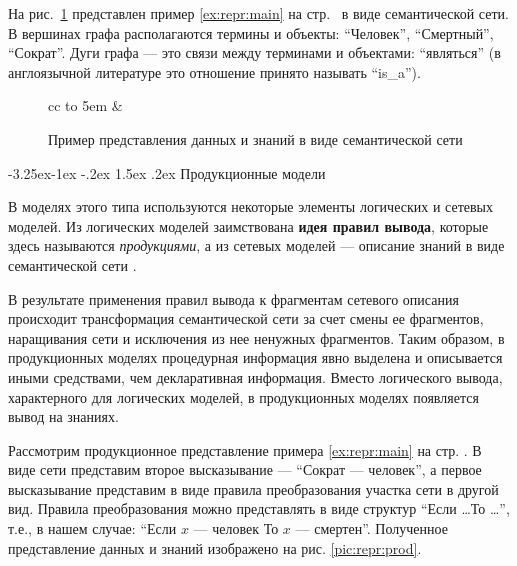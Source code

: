 \documentclass[12pt, openany, twoside]{book} %
\makeatletter
\renewcommand\subsection{\@startsection{subsection}{2}{\z@}%
                                     {-3.25ex\@plus -1ex \@minus -.2ex}%
                                     {1.5ex \@plus .2ex}%
                                     {\normalfont\normalsize\bfseries}}
\makeatother
\begin{document}
На рис.~\ref{pic:repr:semnet} представлен пример \ref{ex:repr:main} на стр.~\pageref{ex:repr:main} в виде семантической сети. В вершинах графа располагаются термины и объекты: ``Человек'', ``Смертный'', ``Сократ''. Дуги графа --- это связи между терминами и объектами: ``являться'' (в англоязычной литературе это отношение принято называть ``is\_a'').
\begin{figure}\small
\begin{center}%
  \begin{tabular}{cc}
	\hbox to 5em {} &
  \end{tabular}
%
%
\end{center}%
\caption{Пример представления данных и знаний в виде семантической сети}
\label{pic:repr:semnet}
\end{figure}

\subsection{Продукционные модели}

В моделях этого типа используются некоторые элементы логических и сетевых моделей. Из логических моделей заимствована {\bf идея правил вывода}, которые здесь называются {\em продукциями}, а из сетевых моделей --- описание знаний в виде семантической сети \cite{AIDictionary}.

В результате применения правил вывода к фрагментам сетевого описания происходит трансформация семантической сети за счет смены ее фрагментов, наращивания сети и исключения из нее ненужных фрагментов. Таким образом, в продукционных моделях процедурная информация явно выделена и описывается иными средствами, чем декларативная информация. Вместо логического вывода, характерного для логических моделей, в продукционных моделях появляется вывод на знаниях.

Рассмотрим продукционное представление примера \ref{ex:repr:main} на стр. \pageref{ex:repr:main}. В виде сети представим второе высказывание --- ``Сократ --- человек'', а первое высказывание представим в виде правила преобразования участка сети в другой вид. Правила преобразования можно представлять в виде структур ``Если \ldots То \ldots '', т.е., в нашем случае: ``Если $x$ --- человек То $x$ --- смертен''. Полученное представление данных и знаний изображено на рис. \ref{pic:repr:prod}.
\end{document}
